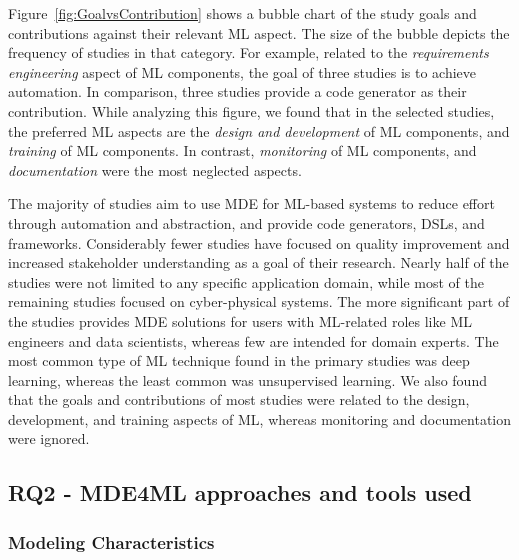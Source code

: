 Figure~\ref{fig:GoalvsContribution} shows a bubble chart of the study goals and contributions against their relevant ML aspect. The size of the bubble depicts the frequency of studies in that category. For example, related to the \textit{requirements engineering} aspect of ML components, the goal of three studies is to achieve automation. In comparison, three studies provide a code generator as their contribution. While analyzing this figure, we found that in the selected studies, the preferred ML aspects are the \textit{design and development} of ML components, and \textit{training} of ML components. In contrast, \textit{monitoring} of ML components, and \textit{documentation} were the most neglected aspects.


\begin{center}
\begin{myframe}[width=45em,top=5pt,bottom=5pt,left=5pt,right=5pt,arc=10pt,auto outer arc,title=\centering\textbf{RQ1 Answer Summary}]
\footnotesize
The majority of studies aim to use MDE for ML-based systems to reduce effort through automation and abstraction, and provide code generators, DSLs, and frameworks. Considerably fewer studies have focused on quality improvement and increased stakeholder understanding as a goal of their research. Nearly half of the studies were not limited to any specific application domain, while most of the remaining studies focused on cyber-physical systems. The more significant part of the studies provides MDE solutions for users with ML-related roles like ML engineers and data scientists, whereas few are intended for domain experts. The most common type of ML technique found in the primary studies was deep learning, whereas the least common was unsupervised learning. We also found that the goals and contributions of most studies were related to the design, development, and training aspects of ML, whereas monitoring and documentation were ignored.
    \end{myframe}
\end{center}

\subsection{RQ2 - MDE4ML approaches and tools used} 

\subsubsection{Modeling Characteristics}

